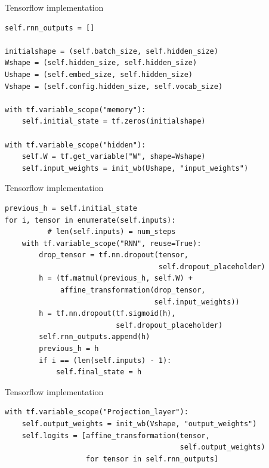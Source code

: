 \documentclass[10pt]{beamer}
\begin{document}
\begin{frame}[fragile]{Tensorflow implementation}
\begin{verbatim}
self.rnn_outputs = []

initialshape = (self.batch_size, self.hidden_size)
Wshape = (self.hidden_size, self.hidden_size)
Ushape = (self.embed_size, self.hidden_size)
Vshape = (self.config.hidden_size, self.vocab_size)

with tf.variable_scope("memory"):
    self.initial_state = tf.zeros(initialshape)

with tf.variable_scope("hidden"):
    self.W = tf.get_variable("W", shape=Wshape)
    self.input_weights = init_wb(Ushape, "input_weights")
\end{verbatim}
\end{frame}

\begin{frame}[fragile]{Tensorflow implementation}
\begin{verbatim}
previous_h = self.initial_state
for i, tensor in enumerate(self.inputs):
          # len(self.inputs) = num_steps
    with tf.variable_scope("RNN", reuse=True):
        drop_tensor = tf.nn.dropout(tensor,
                                    self.dropout_placeholder)
        h = (tf.matmul(previous_h, self.W) +
             affine_transformation(drop_tensor,
                                   self.input_weights))
        h = tf.nn.dropout(tf.sigmoid(h),
                          self.dropout_placeholder)
        self.rnn_outputs.append(h)
        previous_h = h
        if i == (len(self.inputs) - 1):
            self.final_state = h
\end{verbatim}
\end{frame}

\begin{frame}[fragile]{Tensorflow implementation}
\begin{verbatim}
with tf.variable_scope("Projection_layer"):
    self.output_weights = init_wb(Vshape, "output_weights")
    self.logits = [affine_transformation(tensor,
                                         self.output_weights)
                   for tensor in self.rnn_outputs]
\end{verbatim}
\end{frame}
\end{document}

